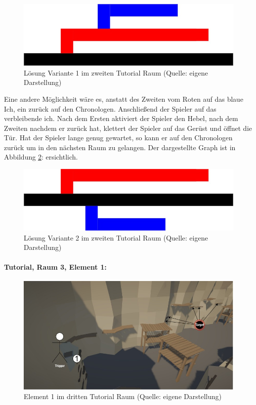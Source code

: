 \begin{figure}[ht]
\centering
\includegraphics[width=0.8\linewidth]{content/pictures/Raetsel-L01_R02_V01_Loesung.jpg}
\caption{Lösung Variante 1 im zweiten Tutorial Raum (Quelle: eigene Darstellung)}
\label{fig:L01_R02_V01_L}
\end{figure}

Eine andere Möglichkeit wäre es, anstatt des Zweiten  vom Roten auf das blaue Ich, ein  zurück auf den Chronologen. Anschließend  der Spieler auf das verbleibende ich. Nach dem Ersten  aktiviert der Spieler den Hebel, nach dem Zweiten  nachdem er zurück  hat, klettert der Spieler auf das Gerüst und öffnet die Tür. Hat der Spieler lange genug gewartet, so kann er auf den Chronologen zurück  um in den nächsten Raum zu gelangen. Der dargestellte Graph ist in Abbildung \ref{fig:L01_R02_V02_L}:  ersichtlich.

\begin{figure}[ht]
\centering
\includegraphics[width=0.8\linewidth]{content/pictures/Raetsel-L01_R02_V02_Loesung.jpg}
\caption{Lösung Variante 2 im zweiten Tutorial Raum (Quelle: eigene Darstellung)}
\label{fig:L01_R02_V02_L}
\end{figure}

\paragraph{Tutorial, Raum 3, Element 1:}

\begin{figure}[ht]
\centering
\includegraphics[width=0.8\linewidth]{content/pictures/Raetsel-L01_R03_R01.jpg}
\caption{Element 1 im dritten Tutorial Raum (Quelle: eigene Darstellung)}
\label{fig:L01_R03_R01}
\end{figure}

